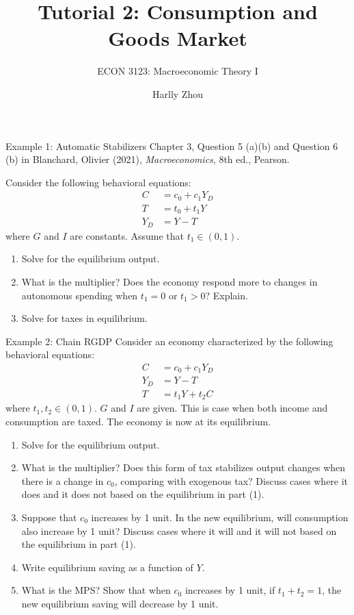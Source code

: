 \documentclass[xcolor=dvipsnames, aspectratio=1610]{beamer}
\title[Measurment of Macroeconomy]{Tutorial 2: Consumption and Goods Market}
\subtitle{ECON 3123: Macroeconomic Theory I}
\author[Harlly Zhou]{Harlly Zhou}
\institute[HKUST]{Department of Economics\\
HKUST Business School}
\date{}
\begin{document}
\begin{frame}
\titlepage
\end{frame}

\begin{frame}{Example 1: Automatic Stabilizers}
    Chapter 3, Question 5 (a)(b) and Question 6 (b) in Blanchard, Olivier (2021), \textit{Macroeconomics}, 8th ed., Pearson.

    Consider the following behavioral equations:
    \begin{align*}
        C &= c_0 + c_1Y_D\\
        T &= t_0 + t_1Y\\
        Y_D &= Y-T
    \end{align*}
    where $G$ and $I$ are constants. Assume that $t_1\in(0,1)$.
    \begin{enumerate}
        \item Solve for the equilibrium output.
        \item What is the multiplier? Does the economy respond more to changes in autonomous spending when $t_1=0$ or $t_1>0$? Explain.
        \item Solve for taxes in equilibrium.
    \end{enumerate}
\end{frame}

\begin{frame}{Example 2: Chain RGDP}
    Consider an economy characterized by the following behavioral equations:
    \begin{align*}
        C &= c_0 + c_1 Y_D\\
        Y_D &= Y - T\\
        T &= t_1 Y + t_2 C
    \end{align*}
    where $t_1, t_2 \in (0,1)$. $G$ and $I$ are given. This is case when both income and consumption are taxed. The economy is now at its equilibrium.
    \begin{enumerate}
        \item Solve for the equilibrium output.
        \item What is the multiplier? Does this form of tax stabilizes output changes when there is a change in $c_0$, comparing with exogenous tax? Discuss cases where it does and it does not based on the equilibrium in part (1).
        \item Suppose that $c_0$ increases by 1 unit. In the new equilibrium, will consumption also increase by 1 unit? Discuss cases where it will and it will not based on the equilibrium in part (1).
        \item Write equilibrium saving as a function of $Y$.
        \item What is the MPS? Show that when $c_0$ increases by 1 unit, if $t_1+t_2=1$, the new equilibrium saving will decrease by 1 unit.
    \end{enumerate} 
\end{frame}
\end{document}
